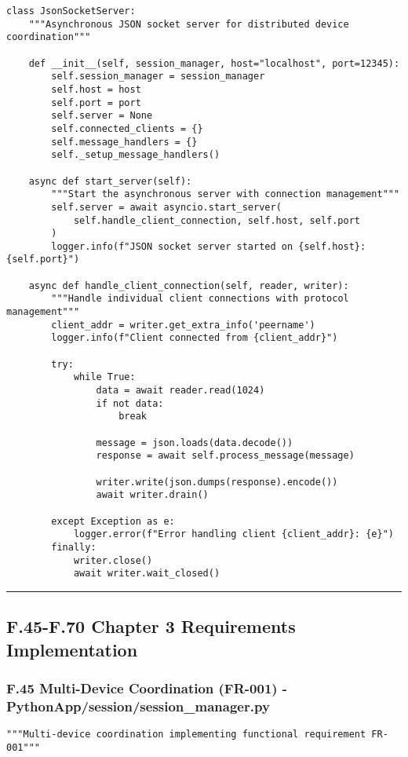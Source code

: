 \documentclass[11pt,a4paper]{report}
\begin{document}
{{\begin{verbatim}
class JsonSocketServer:
    """Asynchronous JSON socket server for distributed device coordination"""

    def __init__(self, session_manager, host="localhost", port=12345):
        self.session_manager = session_manager
        self.host = host
        self.port = port
        self.server = None
        self.connected_clients = {}
        self.message_handlers = {}
        self._setup_message_handlers()

    async def start_server(self):
        """Start the asynchronous server with connection management"""
        self.server = await asyncio.start_server(
            self.handle_client_connection, self.host, self.port
        )
        logger.info(f"JSON socket server started on {self.host}:{self.port}")

    async def handle_client_connection(self, reader, writer):
        """Handle individual client connections with protocol management"""
        client_addr = writer.get_extra_info('peername')
        logger.info(f"Client connected from {client_addr}")

        try:
            while True:
                data = await reader.read(1024)
                if not data:
                    break

                message = json.loads(data.decode())
                response = await self.process_message(message)

                writer.write(json.dumps(response).encode())
                await writer.drain()

        except Exception as e:
            logger.error(f"Error handling client {client_addr}: {e}")
        finally:
            writer.close()
            await writer.wait_closed()
\end{verbatim}

\hrule

\subsection{F.45-F.70 Chapter 3 Requirements Implementation}

\subsubsection{F.45 Multi-Device Coordination (FR-001) - PythonApp/session/session_manager.py}

\begin{verbatim}
"""Multi-device coordination implementing functional requirement FR-001"""



\end{verbatim}}}
\end{document}
